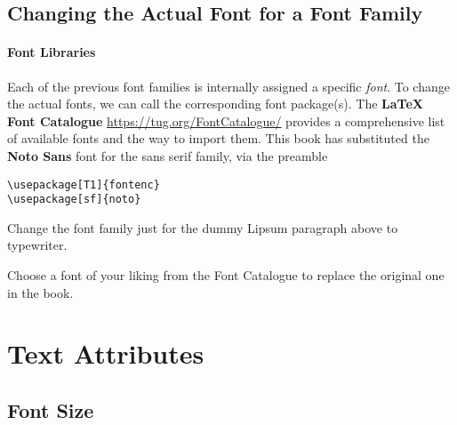 \subsection{Changing the Actual Font for a Font Family}

\paragraph{Font Libraries}
Each of the previous font families is internally assigned a specific \textit{font}. To change the actual fonts, we can call the corresponding font package(s). The \textbf{\LaTeX{} Font Catalogue} \href{https://tug.org/FontCatalogue/}{https://tug.org/FontCatalogue/} provides a comprehensive list of available fonts and the way to import them. This book has substituted the \textbf{Noto Sans} font for the sans serif family, via the preamble
\begin{lstlisting}
\usepackage[T1]{fontenc}
\usepackage[sf]{noto}
\end{lstlisting}

\begin{exercisebox}
\begin{Exercise}
Change the font family just for the dummy Lipsum paragraph above to typewriter.
\end{Exercise}
\begin{Exercise}
Choose a font of your liking from the Font Catalogue to replace the original one in the book.
\end{Exercise}
\end{exercisebox}

\section{Text Attributes}

\subsection{Font Size}


